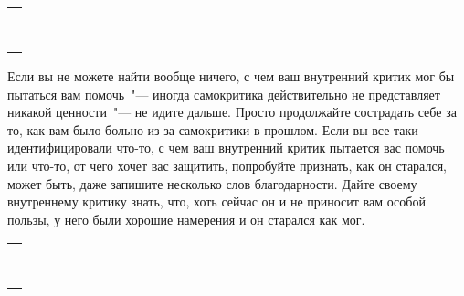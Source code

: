 \setlength{\extrarowheight}{2mm}
\begin{tabularx}{\textwidth}{X}
	\\
	\arrayrulecolor{gray}\hline\\
	\hline\\
	\hline\\
	\hline\\
	\hline\\
	\hline\\	
	\hline\\
	\hline\\
	\hline\\
\end{tabularx}
\setlength{\extrarowheight}{0mm}
\begin{itemize}
	\itemWritingHand Если вы не можете найти вообще ничего, с чем ваш внутренний критик мог бы пытаться вам помочь~"--- иногда самокритика действительно не представляет никакой ценности~"--- не идите дальше. Просто продолжайте сострадать себе за то, как вам было больно из-за самокритики в прошлом. Если вы все-таки идентифицировали что-то, с чем ваш внутренний критик пытается вас помочь или что-то, от чего хочет вас защитить, попробуйте признать, как он старался, может быть, даже запишите несколько слов благодарности. Дайте своему внутреннему критику знать, что, хоть сейчас он и не приносит вам особой пользы, у него были хорошие намерения и он старался как мог.
\end{itemize}
\setlength{\extrarowheight}{2mm}
\begin{tabularx}{\textwidth}{X}
	\\
	\arrayrulecolor{gray}\hline\\
	\hline\\
	\hline\\
	\hline\\
	\hline\\
	\hline\\	
	\hline\\
	\hline\\
	\hline\\
\end{tabularx}
\setlength{\extrarowheight}{0mm}

